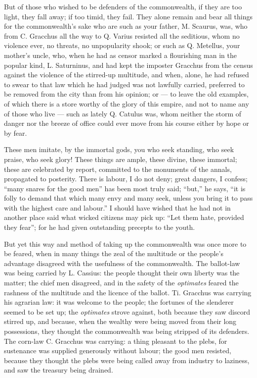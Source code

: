  But of those who wished to be defenders of the commonwealth, if they are too light, they fall away; if too timid, they fail. They alone remain and bear all things for the commonwealth's sake who are such as your father, M. Scaurus, was, who from C. Gracchus all the way to Q. Varius resisted all the seditious, whom no violence ever, no threats, no unpopularity shook; or such as Q. Metellus, your mother's uncle, who, when he had as censor marked a flourishing man in the popular kind, L. Saturninus, and had kept the imposter Gracchus from the census against the violence of the stirred-up multitude, and when, alone, he had refused to swear to that law which he had judged was not lawfully carried, preferred to be removed from the city than from his opinion; or --- to leave the old examples, of which there is a store worthy of the glory of this empire, and not to name any of those who live --- such as lately Q. Catulus was, whom neither the storm of danger nor the breeze of office could ever move from his course either by hope or by fear.

 These men imitate, by the immortal gods, you who seek standing, who seek praise, who seek glory! These things are ample, these divine, these immortal; these are celebrated by report, committed to the monuments of the annals, propagated to posterity. There is labour, I do not deny; great dangers, I confess; ``many snares for the good men'' has been most truly said; ``but,'' he says, ``it is folly to demand that which many envy and many seek, unless you bring it to pass with the highest care and labour.'' I should have wished that he had not in another place said what wicked citizens may pick up: ``Let them hate, provided they fear''; for he had given outstanding precepts to the youth.

 But yet this way and method of taking up the commonwealth was once more to be feared, when in many things the zeal of the multitude or the people's advantage disagreed with the usefulness of the commonwealth. The ballot-law was being carried by L. Cassius: the people thought their own liberty was the matter; the chief men disagreed, and in the safety of the \textit{optimates} feared the rashness of the multitude and the licence of the ballot. Ti. Gracchus was carrying his agrarian law: it was welcome to the people; the fortunes of the slenderer seemed to be set up; the \textit{optimates} strove against, both because they saw discord stirred up, and because, when the wealthy were being moved from their long possessions, they thought the commonwealth was being stripped of its defenders. The corn-law C. Gracchus was carrying: a thing pleasant to the plebs, for sustenance was supplied generously without labour; the good men resisted, because they thought the plebs were being called away from industry to laziness, and saw the treasury being drained.

